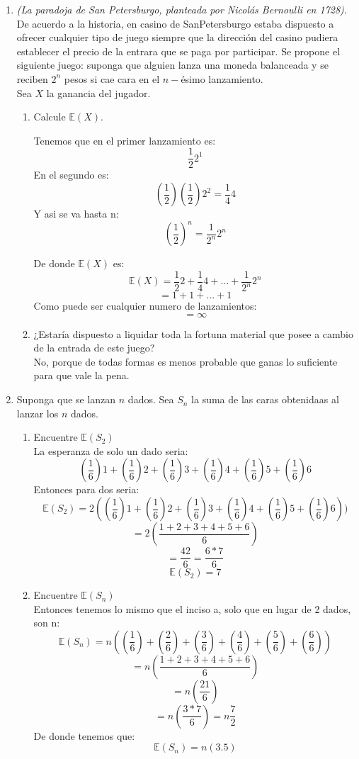 \documentclass[12pt,a4paper]{report}
\begin{document}
\begin{enumerate}
		\item{
			\textit{(La paradoja de San Petersburgo, planteada por Nicolás
			Bernoulli en 1728)}.\\
			De acuerdo a la historia, en casino de SanPetersburgo estaba
			dispuesto a ofrecer cualquier tipo de juego siempre que la
			dirección del casino pudiera establecer el precio de la entrara
			que se paga por participar. Se propone el siguiente juego: suponga
			que alguien lanza una moneda balanceada y se reciben $2^n$ pesos
			si cae cara en el $n-$ésimo lanzamiento.\\
			Sea $X$ la ganancia del jugador.
			\begin{enumerate}
				\item {
				Calcule $\mathbb{E}(X)$.

				Tenemos que en el primer lanzamiento es:
				\[\frac{1}{2}2^{1}\]
				En el segundo es:
				\[(\frac{1}{2})(\frac{1}{2})2^{2} = \frac{1}{4}4\]
				Y asi se va hasta n:
				\[(\frac{1}{2})^{n} = \frac{1}{2^{n}}2^{n}\]
				}
				De donde $\mathbb{E}(X)$ es:
				\[\mathbb{E}(X) = \frac{1}{2}2 + \frac{1}{4}4 + ... +  \frac{1}{2^{n}}2^{n}\]
				\[= 1 + 1 + ... + 1\]
				Como puede ser cualquier numero de lanzamientos:
				\[= \infty\]

				\item {
				¿Estaría dispuesto a liquidar toda la fortuna material que
				posee a cambio de la entrada de este juego?\\
				No, porque de todas formas es menos probable que ganas lo suficiente para que vale la pena.
				}
			\end{enumerate}
		}

		\item{
			Suponga que se lanzan $n$ dados. Sea $S_n$ la suma de las caras
			obtenidaas al lanzar los $n$ dados.
			\begin{enumerate}
				\item {
					Encuentre $\mathbb{E}(S_2)$\\
					La esperanza de solo un dado seria:
					\[(\frac{1}{6})1 + (\frac{1}{6})2 + (\frac{1}{6})3 + (\frac{1}{6})4 + (\frac{1}{6})5 + (\frac{1}{6})6\]
					Entonces para dos seria:
					\[\mathbb{E}(S_2) = 2((\frac{1}{6})1 + (\frac{1}{6})2 + (\frac{1}{6})3 + (\frac{1}{6})4 + (\frac{1}{6})5 + (\frac{1}{6})6))\]
					\[= 2(\frac{1+2+3+4+5+6}{6})\]
					\[=\frac{42}{6} = \frac{6 * 7}{6}\]
					\[\mathbb{E}(S_2) = 7\]
				}

				\item {
					Encuentre $\mathbb{E}(S_n)$\\
					Entonces tenemos lo mismo que el inciso a, solo que en lugar de 2 dados, son n:
					\[\mathbb{E}(S_n) = n((\frac{1}{6}) + (\frac{2}{6}) + (\frac{3}{6})+ (\frac{4}{6}) + (\frac{5}{6}) + (\frac{6}{6}))\]
					\[= n(\frac{1+2+3+4+5+6}{6})\]
					\[= n(\frac{21}{6})\]
					\[= n(\frac{3 * 7}{6}) = n\frac{7}{2}\]
					De donde tenemos que:
					\[\mathbb{E}(S_n) = n(3.5)\]
				}
			\end{enumerate}
		}


\end{enumerate}
\end{document}
